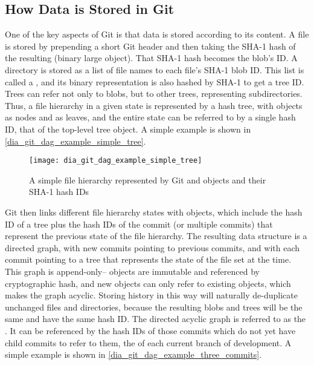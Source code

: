 


%

\subsection{How Data is Stored in Git}

One of the key aspects of Git is that data is stored according to its content. A
file is stored by prepending a short Git header and then taking the SHA-1 hash
of the resulting  (binary large object). That SHA-1 hash becomes
the blob's ID. A directory is stored as a list of file names to each file's
SHA-1 blob ID. This list is called a , and its binary
representation is also hashed by SHA-1 to get a tree ID. Trees can refer not
only to blobs, but to other trees, representing subdirectories. Thus, a file
hierarchy in a given state is represented by a hash tree, with 
objects as nodes and  as leaves, and the entire state can be
referred to by a single hash ID, that of the top-level tree object. A simple
example is shown in \autoref{dia_git_dag_example_simple_tree}.

\begin{figure}[h]
    \centering
    \texttt{[image: dia\_git\_dag\_example\_simple\_tree]}
    \caption{A simple file hierarchy represented by Git  and
         objects and their SHA-1 hash IDs}
    \label{dia_git_dag_example_simple_tree}
\end{figure}

Git then links different file hierarchy states with  objects,
which include the hash ID of a tree plus the hash IDs of the commit (or multiple
commits) that represent the previous state of the file hierarchy. The resulting
data structure is a directed graph, with new commits pointing to previous
commits, and with each commit pointing to a tree that represents the state of
the file set at the time. This graph is append-only-- objects are immutable and
referenced by cryptographic hash, and new objects can only refer to existing
objects, which makes the graph acyclic. Storing history in this way will
naturally de-duplicate unchanged files and directories, because the resulting
blobs and trees will be the same and have the same hash ID. The directed acyclic
graph is referred to as the . It can be referenced by the hash IDs
of those commits which do not yet have child commits to refer to them, the
 of each current branch of development. A simple example is shown
in \autoref{dia_git_dag_example_three_commits}.

